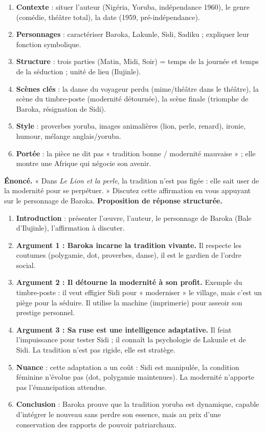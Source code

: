 \documentclass[11pt]{article}
\begin{document}
\begin{methode}
\begin{enumerate}
\item \textbf{Contexte} : situer l'auteur (Nigéria, Yoruba, indépendance 1960), le genre (comédie, théâtre total), la date (1959, pré-indépendance).
\item \textbf{Personnages} : caractériser Baroka, Lakunle, Sidi, Sadiku ; expliquer leur fonction symbolique.
\item \textbf{Structure} : trois parties (Matin, Midi, Soir) = temps de la journée et temps de la séduction ; unité de lieu (Ilujinle).
\item \textbf{Scènes clés} : la danse du voyageur perdu (mime/théâtre dans le théâtre), la scène du timbre-poste (modernité détournée), la scène finale (triomphe de Baroka, résignation de Sidi).
\item \textbf{Style} : proverbes yoruba, images animalières (lion, perle, renard), ironie, humour, mélange anglais/yoruba.
\item \textbf{Portée} : la pièce ne dit pas « tradition bonne / modernité mauvaise » ; elle montre une Afrique qui négocie son avenir.
\end{enumerate}
\end{methode}

\begin{exoresolu}
\textbf{Énoncé.} « Dans \emph{Le Lion et la perle}, la tradition n'est pas figée : elle sait user de la modernité pour se perpétuer. » Discutez cette affirmation en vous appuyant sur le personnage de Baroka.
\tcblower
\textbf{Proposition de réponse structurée.}
\begin{enumerate}
\item \textbf{Introduction} : présenter l'œuvre, l'auteur, le personnage de Baroka (Bale d'Ilujinle), l'affirmation à discuter.
\item \textbf{Argument 1 : Baroka incarne la tradition vivante.} Il respecte les coutumes (polygamie, dot, proverbes, danse), il est le gardien de l'ordre social.
\item \textbf{Argument 2 : Il détourne la modernité à son profit.} Exemple du timbre-poste : il veut effigier Sidi pour « moderniser » le village, mais c'est un piège pour la séduire. Il utilise la machine (imprimerie) pour asseoir son prestige personnel.
\item \textbf{Argument 3 : Sa ruse est une intelligence adaptative.} Il feint l'impuissance pour tester Sidi ; il connaît la psychologie de Lakunle et de Sidi. La tradition n'est pas rigide, elle est stratège.
\item \textbf{Nuance} : cette adaptation a un coût : Sidi est manipulée, la condition féminine n'évolue pas (dot, polygamie maintenues). La modernité n'apporte pas l'émancipation attendue.
\item \textbf{Conclusion} : Baroka prouve que la tradition yoruba est dynamique, capable d'intégrer le nouveau sans perdre son essence, mais au prix d'une conservation des rapports de pouvoir patriarchaux.
\end{enumerate}
\end{exoresolu}
\end{document}
